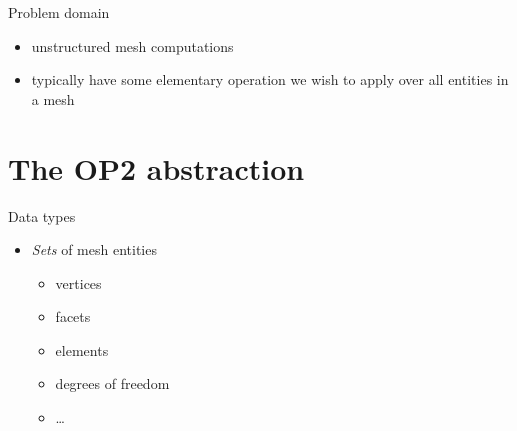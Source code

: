 \documentclass[presentation]{beamer}
\begin{document}
\begin{frame}[label={sec:orgheadline4}]{Problem domain}
\begin{itemize}
\item unstructured mesh computations
\item typically have some elementary operation we wish to apply over all
entities in a mesh
\end{itemize}
\end{frame}

\section{The OP2 abstraction}
\label{sec:orgheadline13}
\begin{frame}[label={sec:orgheadline6}]{Data types}
\begin{itemize}
\item \emph{Sets} of mesh entities
\begin{itemize}
\item vertices
\item facets
\item elements
\item degrees of freedom
\item \ldots{}
\end{itemize}
\end{itemize}

\begin{center}




\par
\end{center}
\end{frame}
\end{document}

